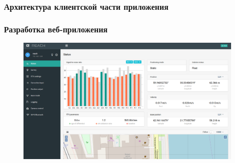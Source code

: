 \documentclass[xetex,t]{beamer}
\begin{document}
%
%
\begin{frame}
  \frametitle{Архитектура клиентской части приложения}
\end{frame}


%
%
\begin{frame}
  \frametitle{Разработка веб-приложения}
  \vskip -0.5cm
  \begin{figure}[h]
    \centering
    \includegraphics[width=.95\textwidth]{../img/reachview/home}
  \end{figure}
\end{frame}
\end{document}
